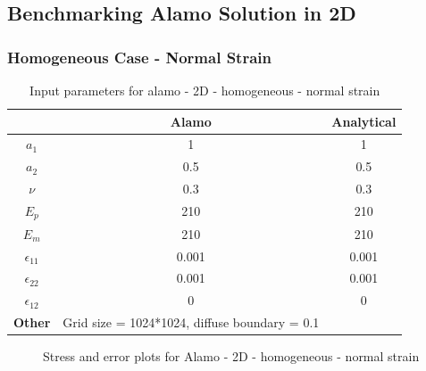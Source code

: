 \documentclass[12pt, a4paper]{report}
\begin{document}
\newpage
\subsection{Benchmarking Alamo Solution in 2D}

\subsubsection{Homogeneous Case - Normal Strain}
\begin{table}[H]
    \centering
    \begin{tabular}{|c|c|c|}
        \hline
        & \textbf{Alamo} &\textbf{Analytical}\\
        \hline
        \textbf{$a_1$} & 1 & 1 \\
        \hline
        \textbf{$a_2$} & 0.5 & 0.5 \\
        \hline
        \textbf{$\nu$} & 0.3 & 0.3 \\
        \hline
        \textbf{$E_p$} & 210 & 210 \\
        \hline
        \textbf{$E_m$} & 210 & 210 \\
        \hline
        \textbf{$\epsilon_{11}$} & 0.001 & 0.001 \\
        \hline
        \textbf{$\epsilon_{22}$} & 0.001 & 0.001 \\
        \hline
        \textbf{$\epsilon_{12}$} & 0 & 0 \\
        \hline
        \textbf{Other} & Grid size = 1024*1024, diffuse boundary = 0.1&  \\
        \hline
    \end{tabular}
    \caption{Input parameters for alamo - 2D - homogeneous - normal strain}
\end{table}

\begin{figure}[htbp]
  \centering
  \hfill
  \caption{Stress and error plots for Alamo - 2D - homogeneous - normal strain}
\end{figure}
\end{document}
